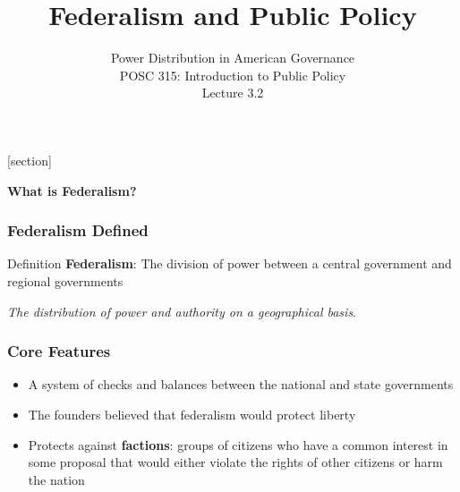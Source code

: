 \documentclass[10pt]{beamer}
\begin{document}
\title{Federalism and Public Policy}
\subtitle{Power Distribution in American Governance\\POSC 315: Introduction to Public Policy\\Lecture 3.2}
\date{}

\maketitle

{
[section]
\begin{frame}[plain]
\vspace{2cm}
\begin{center}
{\Huge\color{white}\textbf{What is Federalism?}}
\end{center}
\end{frame}
}

\begin{frame}
\frametitle{Federalism Defined}

\begin{alertblock}{Definition}
\textbf{Federalism}: The division of power between a central government and regional governments

\vspace{0.3cm}
\emph{The distribution of power and authority on a geographical basis}.
\end{alertblock}

\end{frame}

\begin{frame}
\frametitle{Core Features}

\begin{itemize}
\item<1-> A system of checks and balances between the national and state governments
\item<2-> The founders believed that federalism would protect liberty
\item<3-> Protects against \textcolor{warningcolor}{\textbf{factions}}: groups of citizens who have a common interest in some proposal that would either violate the rights of other citizens or harm the nation
\end{itemize}

\end{frame}
\end{document}
